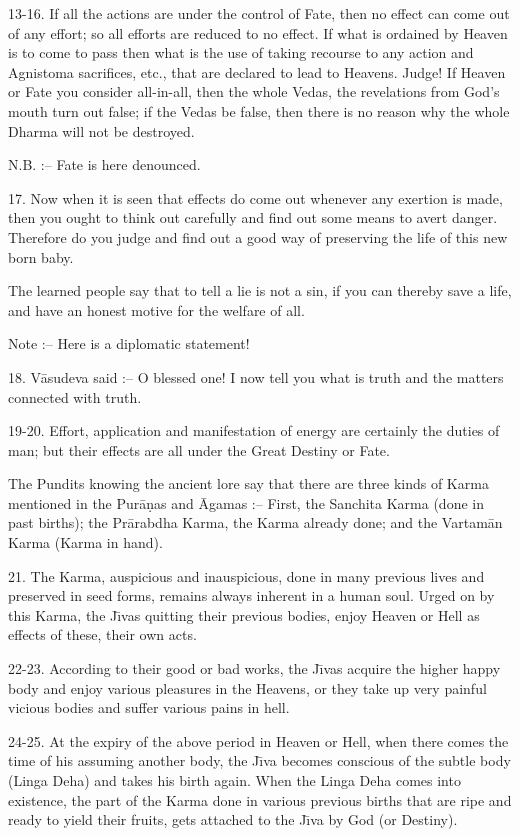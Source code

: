 13-16. If all the actions are under the control of Fate, then no effect can come out of any effort; so all efforts are reduced to no effect. If what is ordained by Heaven is to come to pass then what is the use of taking recourse to any action and Agnistoma sacrifices, etc., that are declared to lead to Heavens. Judge! If Heaven or Fate you consider all-in-all, then the whole Vedas, the revelations from God's mouth turn out false; if the Vedas be false, then there is no reason why the whole Dharma will not be destroyed.

N.B. :-- Fate is here denounced.

17. Now when it is seen that effects do come out whenever any exertion is made, then you ought to think out carefully and find out some means to avert danger. Therefore do you judge and find out a good way of preserving the life of this new born baby.

The learned people say that to tell a lie is not a sin, if you can thereby save a life, and have an honest motive for the welfare of all.

Note :-- Here is a diplomatic statement!

18. V\=asudeva said :-- O blessed one! I now tell you what is truth and the matters connected with truth.

19-20. Effort, application and manifestation of energy are certainly the duties of man; but their effects are all under the Great Destiny or Fate.

The Pundits knowing the ancient lore say that there are three kinds of Karma mentioned in the Pur\=a\d{n}as and \=Agamas :-- First, the Sanchita Karma (done in past births); the Pr\=arabdha Karma, the Karma already done; and the Vartam\=an Karma (Karma in hand).

21. The Karma, auspicious and inauspicious, done in many previous lives and preserved in seed forms, remains always inherent in a human soul. Urged on by this Karma, the J\={\i}vas quitting their previous bodies, enjoy Heaven or Hell as effects of these, their own acts.

22-23. According to their good or bad works, the J\={\i}vas acquire the higher happy body and enjoy various pleasures in the Heavens, or they take up very painful vicious bodies and suffer various pains in hell.

24-25. At the expiry of the above period in Heaven or Hell, when there comes the time of his assuming another body, the J\={\i}va becomes conscious of the subtle body (Linga Deha) and takes his birth again. When the Linga Deha comes into existence, the part of the Karma done in various previous births that are ripe and ready to yield their fruits, gets attached to the J\={\i}va by God (or Destiny).

